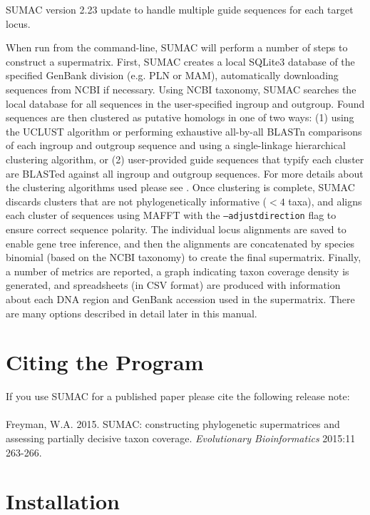 \documentclass[10pt]{report}
\begin{document}
SUMAC version 2.23
update to handle multiple guide sequences for each target locus.

When run from the command-line, SUMAC will perform a number of steps to construct
a supermatrix.
First, SUMAC creates a local SQLite3 \citep{sqlite} database of the specified GenBank division (e.g. PLN or MAM),
automatically downloading sequences from NCBI if necessary.
Using NCBI taxonomy, SUMAC searches the local database for all sequences in the user-specified ingroup
and outgroup.
Found sequences are then clustered as putative homologs in one of two ways:
(1) using the UCLUST \citep{edgar2010search} algorithm or performing exhaustive all-by-all BLASTn \citep{blast} comparisons of each ingroup and outgroup sequence
and using a single-linkage hierarchical clustering algorithm, or
(2) user-provided guide sequences that typify each cluster are BLASTed against all ingroup and outgroup sequences.
For more details about the clustering algorithms used please see \citet{sumac}.
Once clustering is complete, SUMAC discards clusters that are not phylogenetically informative ($< 4$ taxa),
and aligns each cluster of sequences using MAFFT \citep{katoh2002mafft} with the \texttt{--adjustdirection} flag
to ensure correct sequence polarity.
The individual locus alignments are saved to enable gene tree inference,
and then the alignments are concatenated by species binomial (based on the NCBI taxonomy)
to create the final supermatrix.
Finally, a number of metrics are reported,
a graph indicating taxon coverage density is generated, and spreadsheets (in CSV format)
are produced with information about each DNA region and GenBank accession used in
the supermatrix.
There are many options described in
detail later in this manual. 

\section{Citing the Program}

If you use SUMAC for a published paper please cite the following release note: \\
\\
Freyman, W.A. 2015. SUMAC: constructing phylogenetic supermatrices and assessing partially decisive taxon coverage.
\textit{Evolutionary Bioinformatics} 2015:11 263-266.

\section{Installation}
\end{document}
